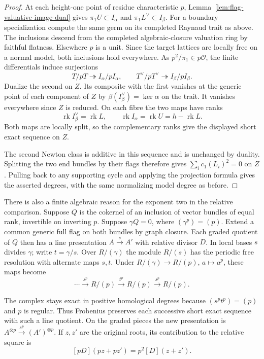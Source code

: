 \begin{proof}
At each height-one point of residue characteristic \(p\), Lemma~\ref{lem:flag-valuative-image-dual} gives \(\pi_1U\subset I_\alpha\) and \(\pi_1L^\vee\subset I_\beta\). For a boundary specialization compute the same germ on its completed Raynaud trait as above. The inclusions descend from the completed algebraic-closure valuation ring by faithful flatness. Elsewhere \(p\) is a unit. Since the target lattices are locally free on a normal model, both inclusions hold everywhere. As \(p^2/\pi_1\in p\mathcal O\), the finite differentials induce surjections
\[
 T/pT\twoheadrightarrow I_\alpha/pI_\alpha,\qquad
 T^\vee/pT^\vee\twoheadrightarrow I_\beta/pI_\beta .
\]
Dualize the second on \(Z\). Its composite with the first vanishes at the generic point of each component of \(Z\) by \(\beta(I_\beta^\vee)=\ker\alpha\) on the trait. It vanishes everywhere since \(Z\) is reduced. On each fibre the two maps have ranks
\[
 \operatorname{rk} I_\beta^\vee=\operatorname{rk} L,\qquad
 \operatorname{rk} I_\alpha=\operatorname{rk} U=h-\operatorname{rk}L .
\]
Both maps are locally split, so the complementary ranks give the displayed short exact sequence on \(Z\).

The second Newton class is additive in this sequence and is unchanged by duality. Splitting the two end bundles by their flags therefore gives \(\sum_i c_1(L_i)^2=0\) on \(Z\). Pulling back to any supporting cycle and applying the projection formula gives the asserted degrees, with the same normalizing model degree as before.
\end{proof}

There is also a finite algebraic reason for the exponent two in the relative comparison. Suppose \(Q\) is the cokernel of an inclusion of vector bundles of equal rank, invertible on inverting \(p\). Suppose \(\gamma Q=0\), where \((\gamma^p)=(p)\). Extend a common generic full flag on both bundles by graph closure. Each graded quotient of \(Q\) then has a line presentation \(A\xrightarrow{s}A'\) with relative divisor \(D\). In local bases \(s\) divides \(\gamma\); write \(t=\gamma/s\). Over \(R/(\gamma)\) the module \(R/(s)\) has the periodic free resolution with alternate maps \(s,t\). Under \(R/(\gamma)\to R/(p)\), \(a\mapsto a^p\), these maps become
\[
 \cdots\xrightarrow{\ s^p\ }R/(p)\xrightarrow{\ t^p\ }R/(p)
                  \xrightarrow{\ s^p\ }R/(p).
\]


The complex stays exact in positive homological degrees because \((s^pt^p)=(p)\) and \(p\) is regular. Thus Frobenius preserves each successive short exact sequence with such a line quotient. On the graded pieces the new presentation is \(A^{\otimes p}\xrightarrow{s^p}(A')^{\otimes p}\). If \(z,z'\) are the original roots, its contribution to the relative square is
\[
                    [pD](pz+pz')=p^2[D](z+z').
\]


